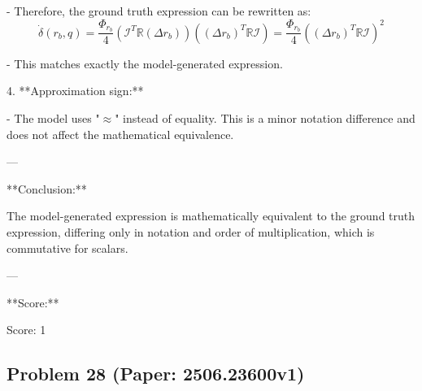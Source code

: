 \documentclass[10pt]{article}
\begin{document}
- Therefore, the ground truth expression can be rewritten as:
\[
\dot{\delta}(r_b, q) = \frac{\Phi_{r_b}}{4} \left( \mathcal{I}^T \mathbb{R} (\Delta r_b) \right) \left( (\Delta r_b)^T \mathbb{R} \mathcal{I} \right) = \frac{\Phi_{r_b}}{4} \left( (\Delta r_b)^T \mathbb{R} \mathcal{I} \right)^2
\]

- This matches exactly the model-generated expression.

4. **Approximation sign:**

- The model uses "\(\approx\)" instead of equality. This is a minor notation difference and does not affect the mathematical equivalence.

---

**Conclusion:**

The model-generated expression is mathematically equivalent to the ground truth expression, differing only in notation and order of multiplication, which is commutative for scalars.

---

**Score:**

Score: 1

\newpage
\subsection*{Problem 28 (Paper: 2506.23600v1)}
\end{document}
